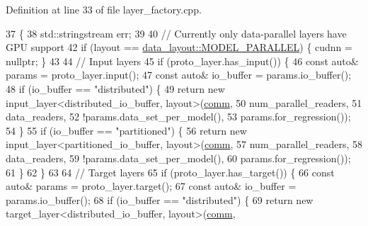 Definition at line 33 of file layer\+\_\+factory.\+cpp.


\begin{DoxyCode}
37                                                            \{
38   std::stringstream err;
39 
40   \textcolor{comment}{// Currently only data-parallel layers have GPU support}
42 \textcolor{comment}{}  \textcolor{keywordflow}{if} (layout == \hyperlink{base_8hpp_a786677cbfb3f5677b4d84f3056eb08dbac94d7b0e44ab8bdcdad694a673cdeae0}{data\_layout::MODEL\_PARALLEL}) \{ cudnn = \textcolor{keyword}{nullptr}; \}
43 
44   \textcolor{comment}{// Input layers}
45   \textcolor{keywordflow}{if} (proto\_layer.has\_input()) \{
46     \textcolor{keyword}{const} \textcolor{keyword}{auto}& params = proto\_layer.input();
47     \textcolor{keyword}{const} \textcolor{keyword}{auto}& io\_buffer = params.io\_buffer();
48     \textcolor{keywordflow}{if} (io\_buffer == \textcolor{stringliteral}{"distributed"}) \{
49       \textcolor{keywordflow}{return} \textcolor{keyword}{new} input\_layer<distributed\_io\_buffer, layout>(\hyperlink{file__io_8cpp_ab048c6f9fcbcfaa57ce68b00263dbebe}{comm},
50                                                             num\_parallel\_readers,
51                                                             data\_readers,
52                                                             !params.data\_set\_per\_model(),
53                                                             params.for\_regression());
54     \}
55     \textcolor{keywordflow}{if} (io\_buffer == \textcolor{stringliteral}{"partitioned"}) \{
56       \textcolor{keywordflow}{return} \textcolor{keyword}{new} input\_layer<partitioned\_io\_buffer, layout>(\hyperlink{file__io_8cpp_ab048c6f9fcbcfaa57ce68b00263dbebe}{comm},
57                                                             num\_parallel\_readers,
58                                                             data\_readers,
59                                                             !params.data\_set\_per\_model(),
60                                                             params.for\_regression());
61     \}
62   \}
63 
64   \textcolor{comment}{// Target layers}
65   \textcolor{keywordflow}{if} (proto\_layer.has\_target()) \{
66     \textcolor{keyword}{const} \textcolor{keyword}{auto}& params = proto\_layer.target();
67     \textcolor{keyword}{const} \textcolor{keyword}{auto}& io\_buffer = params.io\_buffer();
68     \textcolor{keywordflow}{if} (io\_buffer == \textcolor{stringliteral}{"distributed"}) \{
69       \textcolor{keywordflow}{return} \textcolor{keyword}{new} target\_layer<distributed\_io\_buffer, layout>(\hyperlink{file__io_8cpp_ab048c6f9fcbcfaa57ce68b00263dbebe}{comm},

\end{DoxyCode}
